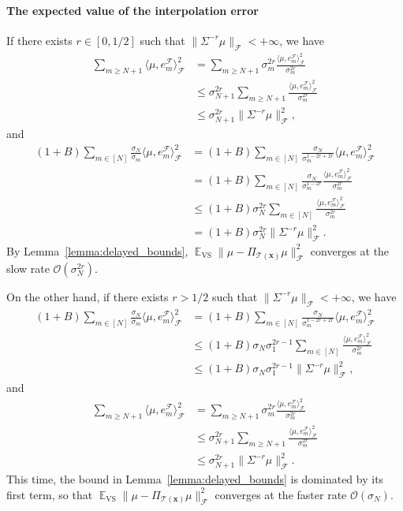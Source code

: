 \documentclass[twoside,11pt]{book}
\numberwithin{theorem}{chapter}
\numberwithin{definition}{chapter}
\numberwithin{proposition}{chapter}
\numberwithin{corollary}{chapter}
\numberwithin{example}{chapter}
\numberwithin{lemma}{chapter}
\DeclareMathOperator{\VS}{\mathrm{VS}}
\DeclareMathOperator{\EX}{\mathbb{E}}
\DeclareMathOperator{\F}{\mathcal{F}}
\begin{document}
\paragraph{The expected value of the interpolation error}
If there exists $r \in [0,1/2]$ such that $\displaystyle \| \Sigma^{-r} \mu \|_{\F} < +\infty$, we have
\begin{align}
\sum\limits_{m \geq N+1} \langle \mu,e_{m}^{\F} \rangle_{\F}^{2}
& = \sum\limits_{m \geq N+1} \sigma_{m}^{2r} \frac{ \langle \mu,e_{m}^{\F} \rangle_{\F}^{2}}{\sigma_{m}^{2r}} \\
& \leq \sigma_{N+1}^{2r} \sum\limits_{m \geq N+1} \frac{ \langle \mu,e_{m}^{\F} \rangle_{\F}^{2}}{\sigma_{m}^{2r}} \\
& \leq \sigma_{N+1}^{2r} \|\Sigma^{-r} \mu\|_{\F}^{2},
\end{align}
and
\begin{align}
(1+B) \sum\limits_{m \in [N]} \frac{\sigma_{N}}{\sigma_{m}} \langle \mu,e_{m}^{\F} \rangle_{\F}^{2}
& = (1+B) \sum\limits_{m \in [N]} \frac{\sigma_{N}}{\sigma_{m}^{1-2r+2r}} \langle \mu,e_{m}^{\F} \rangle_{\F}^{2} \\
& = (1+B) \sum\limits_{m \in [N]} \frac{\sigma_{N}}{\sigma_{m}^{1-2r}} \frac{\langle \mu,e_{m}^{\F} \rangle_{\F}^{2}}{\sigma_{m}^{2r}} \\
& \leq (1+B) \sigma_{N}^{2r} \sum\limits_{m \in [N]} \frac{\langle \mu,e_{m}^{\F} \rangle_{\F}^{2}}{\sigma_{m}^{2r}} \\
& = (1+B) \sigma_{N}^{2r} \|\Sigma^{-r} \mu\|_{\F}^{2}.
\end{align}
By Lemma~\ref{lemma:delayed_bounds}, $\displaystyle \EX_{\VS}\| \mu - \Pi_{\mathcal{T}(\bm{x})} \mu \|_{\F}^{2}$ converges at the slow rate $\mathcal{O}(\sigma_{N}^{2r})$.

On the other hand, if there exists $r > 1/2$ such that $\displaystyle \| \Sigma^{-r} \mu \|_{\F} < +\infty$, we have
\begin{align}
(1+B) \sum\limits_{m \in [N]} \frac{\sigma_{N}}{\sigma_{m}} \langle \mu,e_{m}^{\F} \rangle_{\F}^{2}
& = (1+B) \sum\limits_{m \in [N]} \frac{\sigma_{N}}{\sigma_{m}^{1-2r+2r}} \langle \mu,e_{m}^{\F} \rangle_{\F}^{2} \\
& \leq (1+B) \sigma_{N} \sigma_{1}^{2r-1} \sum\limits_{m \in [N]} \frac{\langle \mu,e_{m}^{\F} \rangle_{\F}^{2}}{\sigma_{m}^{2r}} \\
&  \leq (1+B) \sigma_{N} \sigma_{1}^{2r-1} \|\Sigma^{-r} \mu\|_{\F}^{2},
\end{align}
and
\begin{align}
\sum\limits_{m \geq N+1} \langle \mu,e_{m}^{\F} \rangle_{\F}^{2}
& = \sum\limits_{m \geq N+1} \sigma_{m}^{2r} \frac{ \langle \mu,e_{m}^{\F} \rangle_{\F}^{2}}{\sigma_{m}^{2r}} \\
& \leq \sigma_{N+1}^{2r} \sum\limits_{m \geq N+1} \frac{ \langle \mu,e_{m}^{\F} \rangle_{\F}^{2}}{\sigma_{m}^{2r}} \\
& \leq \sigma_{N+1}^{2r} \|\Sigma^{-r} \mu\|_{\F}^{2}.
\end{align}
This time, the bound in Lemma~\ref{lemma:delayed_bounds} is dominated by its first term, so that $\displaystyle \EX_{\VS}\| \mu - \Pi_{\mathcal{T}(\bm{x})} \mu \|_{\F}^{2}$ converges at the faster rate $\mathcal{O}(\sigma_{N})$.
\end{document}
